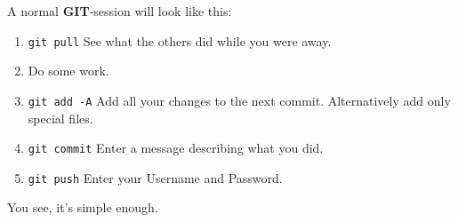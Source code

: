 \documentclass[a4paper]{article}
\newcommand{\git}{\textbf{GIT}}
\begin{document}
A normal \git -session will look like this:\\
\begin{enumerate}
	\item \texttt{git pull} See what the others did while you were away.
	\item Do some work.
	\item \texttt{git add -A} Add all your changes to the next commit. Alternatively add only special files.
	\item \texttt{git commit} Enter a message describing what you did.
	\item \texttt{git push} Enter your Username and Password.
\end{enumerate}
You see, it's simple enough.

\end{document}
